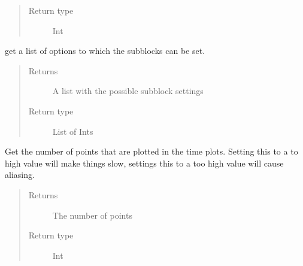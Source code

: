 \documentclass[letterpaper,10pt,english]{sphinxmanual}
\begin{document}
\begin{fulllineitems}
\begin{fulllineitems}
\begin{quote}
\begin{description}
\item[{Return type}] \leavevmode
\sphinxAtStartPar
Int

\end{description}\end{quote}

\end{fulllineitems}


\begin{fulllineitems}
\label{\detokenize{index:TiePieLCR_settings.TiePieLCR_settings.get_sub_blocks_list}}
\sphinxAtStartPar
get a list of options to which the sub\sphinxhyphen{}blocks can be set.
\begin{quote}\begin{description}
\item[{Returns}] \leavevmode
\sphinxAtStartPar
A list with the possible sub\sphinxhyphen{}block settings

\item[{Return type}] \leavevmode
\sphinxAtStartPar
List of Ints

\end{description}\end{quote}

\end{fulllineitems}


\begin{fulllineitems}
\label{\detokenize{index:TiePieLCR_settings.TiePieLCR_settings.get_time_plot_points}}
\sphinxAtStartPar
Get the number of points that are plotted in the time plots. Setting this to a to high value will make things slow, settings this to a too high value will cause aliasing.
\begin{quote}\begin{description}
\item[{Returns}] \leavevmode
\sphinxAtStartPar
The number of points

\item[{Return type}] \leavevmode
\sphinxAtStartPar
Int


\end{description}
\end{quote}
\end{fulllineitems}
\end{fulllineitems}
\end{document}
